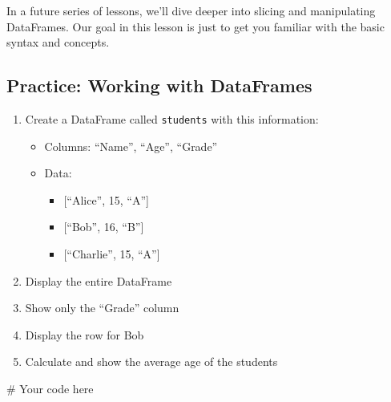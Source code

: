 \documentclass[
  letterpaper,
  DIV=11,
  numbers=noendperiod]{scrreprt}
\newenvironment{Shaded}{\begin{snugshade}}{\end{snugshade}}
\newcommand{\CommentTok}[1]{\textcolor[rgb]{0.37,0.37,0.37}{#1}}
\providecommand{\tightlist}{%
  \setlength{\itemsep}{0pt}\setlength{\parskip}{0pt}}\usepackage{longtable,booktabs,array}
\begin{document}
In a future series of lessons, we'll dive deeper into slicing and
manipulating DataFrames. Our goal in this lesson is just to get you
familiar with the basic syntax and concepts.

\begin{tcolorbox}[enhanced jigsaw, colframe=quarto-callout-tip-color-frame, opacityback=0, titlerule=0mm, bottomrule=.15mm, breakable, leftrule=.75mm, colbacktitle=quarto-callout-tip-color!10!white, title=\textcolor{quarto-callout-tip-color}{\faLightbulb}\hspace{0.5em}{Practice}, rightrule=.15mm, coltitle=black, opacitybacktitle=0.6, colback=white, left=2mm, arc=.35mm, toptitle=1mm, bottomtitle=1mm, toprule=.15mm]

\subsection{Practice: Working with
DataFrames}\label{practice-working-with-dataframes}

\begin{enumerate}
\def\labelenumi{\arabic{enumi}.}
\tightlist
\item
  Create a DataFrame called \texttt{students} with this information:

  \begin{itemize}
  \tightlist
  \item
    Columns: ``Name'', ``Age'', ``Grade''
  \item
    Data:

    \begin{itemize}
    \tightlist
    \item
      {[}``Alice'', 15, ``A''{]}
    \item
      {[}``Bob'', 16, ``B''{]}
    \item
      {[}``Charlie'', 15, ``A''{]}
    \end{itemize}
  \end{itemize}
\item
  Display the entire DataFrame
\item
  Show only the ``Grade'' column
\item
  Display the row for Bob
\item
  Calculate and show the average age of the students
\end{enumerate}

\begin{Shaded}
\begin{Highlighting}[]
\CommentTok{\# Your code here}
\end{Highlighting}
\end{Shaded}

\end{tcolorbox}
\end{document}
